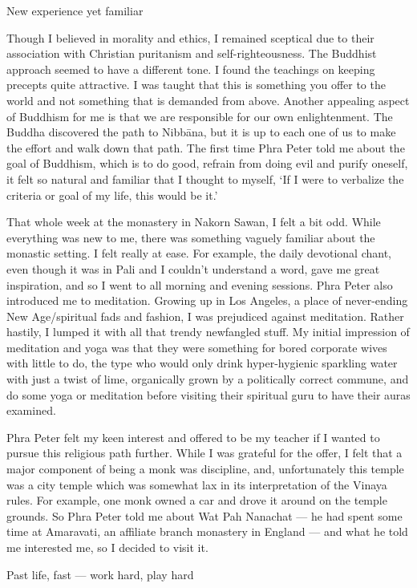 New experience yet familiar

Though I believed in morality and ethics, I remained sceptical due to
their association with Christian puritanism and self-righteousness. The
Buddhist approach seemed to have a different tone. I found the teachings
on keeping precepts quite attractive. I was taught that this is
something you offer to the world and not something that is demanded from
above. Another appealing aspect of Buddhism for me is that we are
responsible for our own enlightenment. The Buddha discovered the path to
Nibbāna, but it is up to each one of us to make the effort and walk down
that path. The first time Phra Peter told me about the goal of Buddhism,
which is to do good, refrain from doing evil and purify oneself, it felt
so natural and familiar that I thought to myself, `If I were to
verbalize the criteria or goal of my life, this would be it.'

That whole week at the monastery in Nakorn Sawan, I felt a bit odd.
While everything was new to me, there was something vaguely familiar
about the monastic setting. I felt really at ease. For example, the
daily devotional chant, even though it was in Pali and I couldn't
understand a word, gave me great inspiration, and so I went to all
morning and evening sessions. Phra Peter also introduced me to
meditation. Growing up in Los Angeles, a place of never-ending New
Age/spiritual fads and fashion, I was prejudiced against meditation.
Rather hastily, I lumped it with all that trendy newfangled stuff. My
initial impression of meditation and yoga was that they were something
for bored corporate wives with little to do, the type who would only
drink hyper-hygienic sparkling water with just a twist of lime,
organically grown by a politically correct commune, and do some yoga or
meditation before visiting their spiritual guru to have their auras
examined.

Phra Peter felt my keen interest and offered to be my teacher if I
wanted to pursue this religious path further. While I was grateful for
the offer, I felt that a major component of being a monk was discipline,
and, unfortunately this temple was a city temple which was somewhat lax
in its interpretation of the Vinaya rules. For example, one monk owned a
car and drove it around on the temple grounds. So Phra Peter told me
about Wat Pah Nanachat --- he had spent some time at Amaravati, an
affiliate branch monastery in England --- and what he told me interested
me, so I decided to visit it.

Past life, fast --- work hard, play hard

